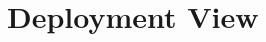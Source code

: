 \documentclass[../../DD.tex]{subfiles}
\begin{document}
\section{Deployment View\label{sect:2.3}}


\newpage
\end{document}

